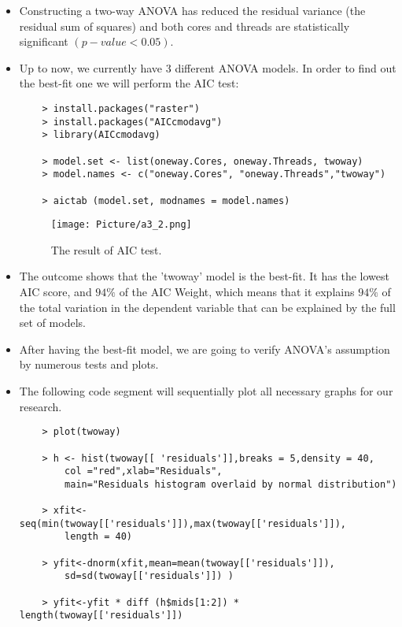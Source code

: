 \documentclass[a4paper]{article}
\begin{document}
\begin{itemize}
    \item[] Constructing a two-way ANOVA has reduced the residual variance (the residual sum of squares) and both cores and threads are statistically significant $(p-value < 0.05)$.
    
    \item[] Up to now, we currently have 3 different ANOVA models. In order to find out the best-fit one we will perform the AIC test:
    \begin{lstlisting}
    > install.packages("raster")
    > install.packages("AICcmodavg")
    > library(AICcmodavg)
    
    > model.set <- list(oneway.Cores, oneway.Threads, twoway)
    > model.names <- c("oneway.Cores", "oneway.Threads","twoway")
    
    > aictab (model.set, modnames = model.names)
    \end{lstlisting}
    
    \begin{figure}[H]
        \centering
        \texttt{[image: Picture/a3\_2.png]}
        \caption{The result of AIC test.}
        \label{7.1.3}
    \end{figure}
    
    \item[] The outcome shows that the 'twoway' model is the best-fit. It has the lowest AIC score, and $94 \%$ of the AIC Weight, which means that it explains $94 \%$ of the total variation in the dependent variable that can be explained by the full set of models.
    
    \item[] After having the best-fit model, we are going to verify ANOVA's assumption by numerous tests and plots.
    \item[] The following code segment will sequentially plot all necessary graphs for our research.
    \begin{lstlisting}
    > plot(twoway)
    
    > h <- hist(twoway[[ 'residuals']],breaks = 5,density = 40,
        col ="red",xlab="Residuals",
        main="Residuals histogram overlaid by normal distribution")
    
    > xfit<-seq(min(twoway[['residuals']]),max(twoway[['residuals']]),
        length = 40)
    
    > yfit<-dnorm(xfit,mean=mean(twoway[['residuals']]),
        sd=sd(twoway[['residuals']]) )
    
    > yfit<-yfit * diff (h$mids[1:2]) * length(twoway[['residuals']])
    

\end{lstlisting}
\end{itemize}
\end{document}
